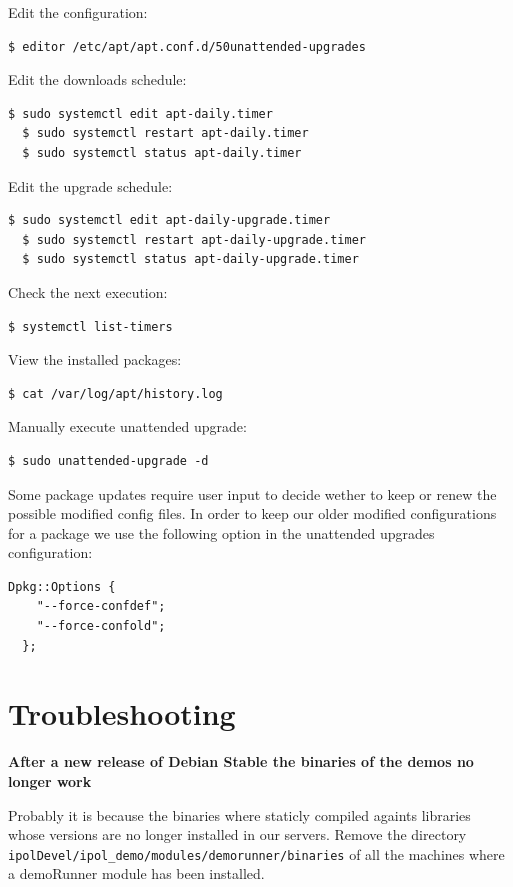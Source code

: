 \documentclass[a4paper,12pt]{article}
\begin{document}
Edit the configuration: 
\begin{lstlisting}[firstnumber=1,breaklines]
  $ editor /etc/apt/apt.conf.d/50unattended-upgrades
\end{lstlisting}

Edit the downloads schedule: 
\begin{lstlisting}[firstnumber=1,breaklines]
  $ sudo systemctl edit apt-daily.timer
  $ sudo systemctl restart apt-daily.timer
  $ sudo systemctl status apt-daily.timer
\end{lstlisting}

Edit the upgrade schedule: 
\begin{lstlisting}[firstnumber=1,breaklines]
  $ sudo systemctl edit apt-daily-upgrade.timer
  $ sudo systemctl restart apt-daily-upgrade.timer
  $ sudo systemctl status apt-daily-upgrade.timer
\end{lstlisting}

Check the next execution: 
\begin{lstlisting}[firstnumber=1,breaklines]
  $ systemctl list-timers
\end{lstlisting}

View the installed packages: 
\begin{lstlisting}[firstnumber=1,breaklines]
  $ cat /var/log/apt/history.log
\end{lstlisting}

Manually execute unattended upgrade:
\begin{lstlisting}[firstnumber=1,breaklines]
  $ sudo unattended-upgrade -d
\end{lstlisting}

Some package updates require user input to decide wether to keep or renew the possible modified config files. In order to keep our older modified configurations for a package we use the following option in the unattended upgrades configuration:

\begin{lstlisting}[firstnumber=1,breaklines]
  Dpkg::Options {
    "--force-confdef";
    "--force-confold";
  };
\end{lstlisting}


\section{Troubleshooting}

\textbf{After a new release of Debian Stable the binaries of the demos no longer work}

Probably it is because the binaries where staticly compiled againts libraries whose versions are no longer installed in our servers. Remove the directory {\tt ipolDevel/ipol\_demo/modules/demorunner/binaries} of all the machines where a demoRunner module has been installed.
\vspace{0.5cm}
\end{document}
